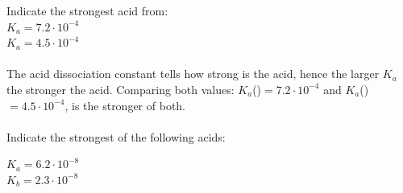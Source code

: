 \documentclass[main.tex]{subfiles}
\begin{document}
\begin{description}
\begin{example} %
Indicate the strongest acid from:\\
 \hfill $K_a=7.2\cdot 10^{-4}$\\
 \hfill $K_a=4.5\cdot 10^{-4}$\\
\\
The acid dissociation constant tells how strong is the acid, hence the larger $K_a$ the stronger the acid. Comparing both values: $K_a$()$=7.2\cdot 10^{-4}$ and $K_a$()$=4.5\cdot 10^{-4}$,  is the stronger of both.
\\
\faDiamond\ \\
Indicate the strongest of the following acids:
\begin{center}
 \hspace{1cm} $K_a=6.2\cdot 10^{-8}$\\
 \hspace{1cm} $K_b=2.3\cdot 10^{-8}$\\
\end{center}
\end{example}%


\end{description}
\end{document}
